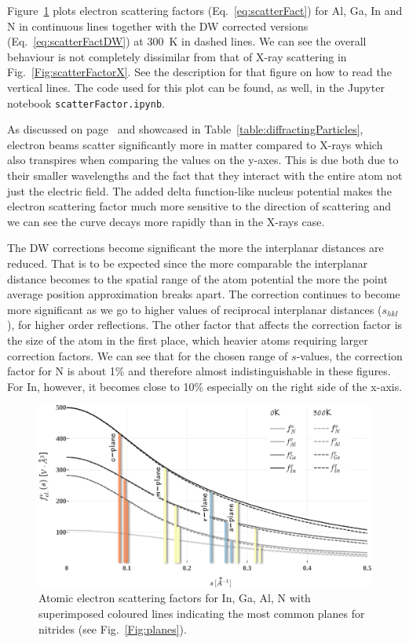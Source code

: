 Figure~\ref{Fig:scatterFactor_e} plots electron scattering factors (Eq.~\ref{eq:scatterFact}) for Al, Ga, In and N in continuous lines together with the DW corrected versions (Eq.~\ref{eq:scatterFactDW}) at \SI{300}{K} in dashed lines. We can see the overall behaviour is not completely dissimilar from that of X-ray scattering in Fig.~\ref{Fig:scatterFactorX}. See the description for that figure on how to read the vertical lines. The code used for this plot can be found, as well, in the Jupyter notebook {\tt scatterFactor.ipynb}. 


As discussed on page~\pageref{table:diffractingParticles} and showcased in Table~\ref{table:diffractingParticles}, electron beams scatter significantly more in matter compared to X-rays which also transpires when comparing the values on the y-axes. This is due both due to their smaller wavelengths and the fact that they interact with the entire atom not just the electric field. The added delta function-like nucleus potential makes the electron scattering factor much more sensitive to the direction of scattering and we can see the curve decays more rapidly than in the X-rays case. 


The DW corrections become significant the more the interplanar distances are reduced. That is to be expected since the more comparable the interplanar distance becomes to the spatial range of the atom potential the more the point average position approximation breaks apart. The correction continues to become more significant as we go to higher values of reciprocal interplanar distances ($s_{hkl}$), \eg for higher order reflections. The other factor that affects the correction factor is the size of the atom in the first place, which heavier atoms requiring larger correction factors. We can see that for the chosen range of $s$-values, the correction factor for N is about 1\% and therefore almost indistinguishable in  these figures. For In, however, it becomes close to 10\% especially on the right side of the x-axis. 


\begin{figure}
    \centering
\includegraphics[width=1\linewidth]{Figures/scatterFactor_ecor.png}
\caption{Atomic electron scattering factors for In, Ga, Al, N with superimposed coloured lines indicating the most common planes for nitrides (see Fig.~\ref{Fig:planes}). }
\label{Fig:scatterFactor_e}
\end{figure}

